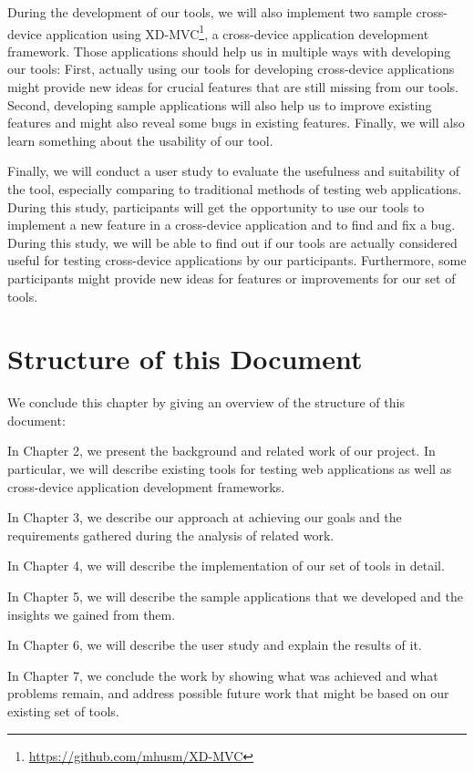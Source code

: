 During the development of our tools, we will also implement two sample cross-device application using XD-MVC\footnote{\url{https://github.com/mhusm/XD-MVC}}, a cross-device application development framework. Those applications should help us in multiple ways with developing our tools: First, actually using our tools for developing cross-device applications might provide new ideas for crucial features that are still missing from our tools. Second, developing sample applications will also help us to improve existing features and might also reveal some bugs in existing features. Finally, we will also learn something about the usability of our tool.

Finally, we will conduct a user study to evaluate the usefulness and suitability of the tool, especially comparing to traditional methods of testing web applications. During this study, participants will get the opportunity to use our tools to implement a new feature in a cross-device application and to find and fix a bug. During this study, we will be able to find out if our tools are actually considered useful for testing cross-device applications by our participants. Furthermore, some participants might provide new ideas for features or improvements for our set of tools.

\section{Structure of this Document}

We conclude this chapter by giving an overview of the structure of this document:

In Chapter 2, we present the background  and related work of our project. In particular, we will describe existing tools for testing web applications as well as cross-device application development frameworks.

In Chapter 3, we describe our approach at achieving our goals and the requirements gathered during the analysis of related work.

In Chapter 4, we will describe the implementation of our set of tools in detail.

In Chapter 5, we will describe the sample applications that we developed and the insights we gained from them.

In Chapter 6, we will describe the user study and explain the results of it.

In Chapter 7, we conclude the work by showing what was achieved and what problems remain, and address possible future work that might be based on our existing set of tools.